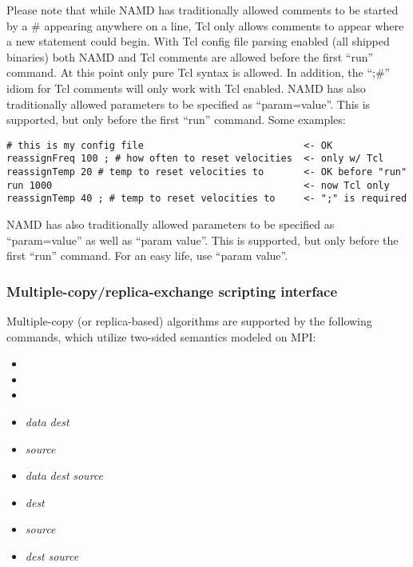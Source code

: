 Please note that while NAMD has traditionally allowed comments to be
started by a \# appearing anywhere on a line, Tcl only allows comments
to appear where a new statement could begin.  With Tcl config file
parsing enabled (all shipped binaries) both NAMD and Tcl comments are
allowed before the first ``run'' command.  At this point only pure Tcl
syntax is allowed.  In addition, the ``;\#'' idiom for Tcl comments will
only work with Tcl enabled.  NAMD has also traditionally allowed
parameters to be specified as ``param=value''.  This is supported, but
only before the first ``run'' command.  Some examples:

\begin{verbatim}
# this is my config file                            <- OK
reassignFreq 100 ; # how often to reset velocities  <- only w/ Tcl
reassignTemp 20 # temp to reset velocities to       <- OK before "run"
run 1000                                            <- now Tcl only
reassignTemp 40 ; # temp to reset velocities to     <- ";" is required
\end{verbatim}

NAMD has also traditionally allowed parameters to be specified as
``param=value'' as well as ``param value''.  This is supported, but only
before the first ``run'' command.  For an easy life, use ``param value''.


\subsubsection{Multiple-copy/replica-exchange scripting interface}
\label{section:replicascripting}

Multiple-copy (or replica-based) algorithms are supported by the following commands,
which utilize two-sided semantics modeled on MPI:

\begin{itemize}
  \item {}
  \item {}
  \item {}
  \item {} {\em data} {\em dest}
  \item {} {\em source}
  \item {} {\em data} {\em dest} {\em source}
  \item {} {\em dest}
  \item {} {\em source}
  \item {} {\em dest} {\em source}
\end{itemize}

